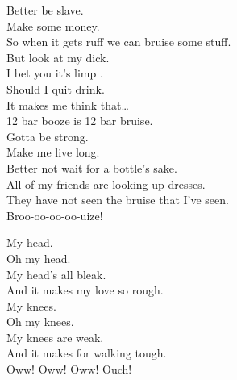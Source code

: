 


Better be slave. \\
Make some money. \\
So when it gets ruff we can bruise some stuff. \\

But look at my dick. \\
I bet you it's limp .\\
Should I quit drink. \\
It makes me think that… \\

12 bar booze is 12 bar bruise. \\

Gotta be strong. \\
Make me live long. \\
Better not wait for a bottle's sake. \\

All of my friends are looking up dresses. \\
They have not seen the bruise that I've seen. \\
Broo-oo-oo-oo-uize! \\




My head. \\
Oh my head. \\
My head's all bleak. \\
And it makes my love so rough. \\

My knees. \\
Oh my knees. \\
My knees are weak. \\
And it makes for walking tough. \\

Oww! Oww! Oww! Ouch! \\




